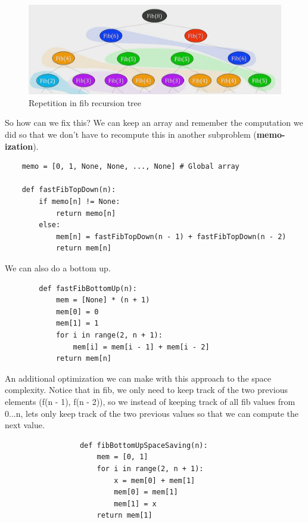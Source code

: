 \documentclass[12pt]{article}
\begin{document}
\begin{figure}[H]
    \centering
    \includegraphics[scale=0.4]{images/fib-recursive-tree.png}
    \caption{Repetition in fib recursion tree}
\end{figure}

So how can we fix this? We can keep an array and remember the computation we did so that we don't have to recompute this in another subproblem (\textbf{memo-ization}).

\begin{lstlisting}
    memo = [0, 1, None, None, ..., None] # Global array

    def fastFibTopDown(n):
        if memo[n] != None:
            return memo[n]
        else:
            mem[n] = fastFibTopDown(n - 1) + fastFibTopDown(n - 2)
            return mem[n]
\end{lstlisting}

We can also do a bottom up.

\begin{lstlisting}
        def fastFibBottomUp(n):
            mem = [None] * (n + 1)
            mem[0] = 0
            mem[1] = 1
            for i in range(2, n + 1):
                mem[i] = mem[i - 1] + mem[i - 2]
            return mem[n]
\end{lstlisting}

An additional optimization we can make with this approach to the space complexity. Notice that in fib, we only need to keep track of the two previous elements (f(n - 1), f(n - 2)), so we instead of keeping track of all fib values from 0...n, lets only keep track of the two previous values so that we can compute the next value.
\begin{figure}[H]
    \begin{lstlisting}
            def fibBottomUpSpaceSaving(n):
                mem = [0, 1]
                for i in range(2, n + 1):
                    x = mem[0] + mem[1]
                    mem[0] = mem[1]
                    mem[1] = x
                return mem[1]
        \end{lstlisting}

\end{figure}
\end{document}
